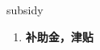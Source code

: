 
\begin{frame}
{\huge subsidy}
\begin{center}
\begin{enumerate}\Large
  \item \textbf{补助金，津贴}
\end{enumerate}
\end{center}
\end{frame}

